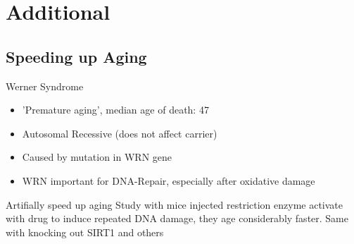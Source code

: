 \appendix
\backupbegin

\section{Additional}
\subsection{Speeding up Aging}

\begin{frame}[c]{Werner Syndrome}
    \large
    \begin{itemize}[<+(1)->]
        \item 'Premature aging', median age of death: 47
        \item Autosomal Recessive (does not affect carrier)
        \item Caused by mutation in WRN gene
        \item WRN important for DNA-Repair, especially after oxidative damage \cite{szekely2005werner}
    \end{itemize}

\end{frame}


\begin{frame}[c]{Artifially speed up aging}
    \large
    Study with mice injected restriction enzyme activate with drug to induce
    repeated DNA damage, they age considerably faster. Same with knocking out SIRT1 and others
\end{frame}


\backupend
